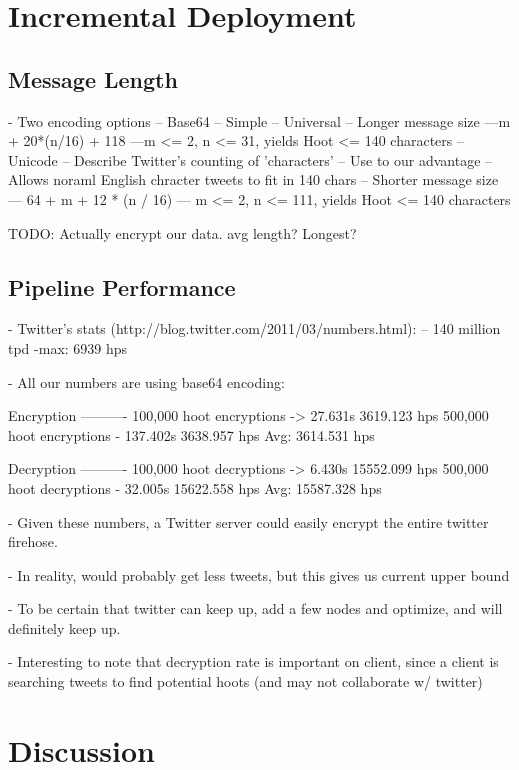 \documentclass{acm_proc_article-sp}
\begin{document}
\section{Incremental Deployment}

\subsection{Message Length}

- Two encoding options
-- Base64
	-- Simple
	-- Universal
	-- Longer message size 
		---m + 20*(n/16) + 118 
		---m <= 2, n <= 31, yields Hoot <= 140 characters
-- Unicode
	-- Describe Twitter's counting of 'characters'
	-- Use to our advantage
	-- Allows noraml English chracter tweets to fit in 140 chars
	-- Shorter message size
	--- 64 + m + 12 * (n / 16)
	--- m <= 2, n <= 111, yields Hoot <= 140 characters
	
	TODO: Actually encrypt our data. avg length? Longest?

\subsection{Pipeline Performance}

- Twitter's stats (http://blog.twitter.com/2011/03/numbers.html):
	-- 140 million tpd
	-max: 6939 hps
	
- All our numbers are using base64 encoding:

Encryption
----------
100,000 hoot encryptions -> 27.631s        3619.123 hps
500,000 hoot encryptions - 137.402s        3638.957 hps
Avg: 3614.531 hps

Decryption
----------
100,000 hoot decryptions -> 6.430s         15552.099 hps
500,000 hoot decryptions - 32.005s         15622.558 hps
Avg: 15587.328 hps

- Given these numbers, a Twitter server could easily encrypt the entire twitter firehose.

- In reality, would probably get less tweets, but this gives us current upper bound

- To be certain that twitter can keep up, add a few nodes and optimize, and will definitely keep up.

- Interesting to note that decryption rate is important on client, since a client is searching tweets to find potential hoots (and may not collaborate w/ twitter)



\section{Discussion}
\end{document}
